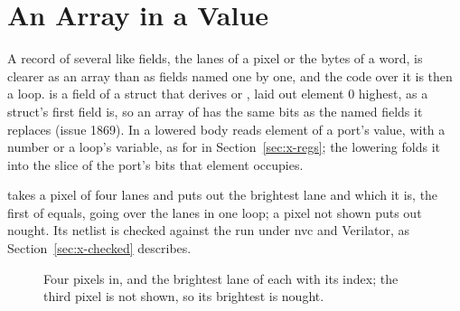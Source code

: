 \section{An Array in a Value}
\label{sec:x-value-arrays}

A record of several like fields, the lanes of a pixel or the bytes of
a word, is clearer as an array than as fields named one by one, and
the code over it is then a loop.
\code{[T; N]} is a field of a struct that derives  or
, laid out element 0 highest, as a struct's first
field is, so an array of  has the same bits as the 
named fields it replaces (issue 1869).
In a lowered body  reads element  of a port's
value, with  a number or a loop's variable, as for
 in Section~\ref{sec:x-regs}; the lowering folds it into the
slice of the port's bits that element occupies.

 takes a pixel of four lanes and puts out the brightest
lane and which it is, the first of equals, going over the lanes in one
loop; a pixel not shown puts out nought.
Its netlist is checked against the run under nvc and Verilator, as
Section~\ref{sec:x-checked} describes.

\begin{figure}[htbp]
\centering

\caption{Four pixels in, and the brightest lane of each with its
index; the third pixel is not shown, so its brightest is nought.}
\label{fig:x-value-arrays}
\end{figure}




